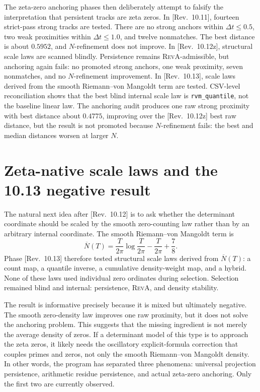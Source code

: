 \documentclass[11pt]{article}
\newcommand{\RevA}{\textsc{RevA}}
\newcommand{\revtag}[1]{\textnormal{[Rev.~#1]}}
\theoremstyle{definition}
\theoremstyle{plain}
\begin{document}
The zeta-zero anchoring phases then deliberately attempt to falsify the interpretation that persistent tracks are zeta zeros.  In \revtag{10.11}, fourteen strict-pass strong tracks are tested.  There are no strong anchors within $\Delta t\le 0.5$, two weak proximities within $\Delta t\le 1.0$, and twelve nonmatches.  The best distance is about $0.5952$, and $N$-refinement does not improve.  In \revtag{10.12z}, structural scale laws are scanned blindly.  Persistence remains \RevA-admissible, but anchoring again fails: no promoted strong anchors, one weak proximity, seven nonmatches, and no $N$-refinement improvement.  In \revtag{10.13}, scale laws derived from the smooth Riemann--von Mangoldt term are tested.  CSV-level reconciliation shows that the best blind internal scale law is \texttt{rvm\_quantile}, not the baseline linear law.  The anchoring audit produces one raw strong proximity with best distance about $0.4775$, improving over the \revtag{10.12z} best raw distance, but the result is not promoted because $N$-refinement fails: the best and median distances worsen at larger $N$.

\section{Zeta-native scale laws and the 10.13 negative result}

The natural next idea after \revtag{10.12} is to ask whether the determinant coordinate should be scaled by the smooth zero-counting law rather than by an arbitrary internal coordinate.  The smooth Riemann--von Mangoldt term is
\begin{equation}
  \overline N(T)=\frac{T}{2\pi}\log\frac{T}{2\pi}-\frac{T}{2\pi}+\frac78.
\end{equation}
Phase \revtag{10.13} therefore tested structural scale laws derived from $\overline N(T)$: a count map, a quantile inverse, a cumulative density-weight map, and a hybrid.  None of these laws used individual zero ordinates during selection.  Selection remained blind and internal: persistence, \RevA{}, and density stability.

The result is informative precisely because it is mixed but ultimately negative.  The smooth zero-density law improves one raw proximity, but it does not solve the anchoring problem.  This suggests that the missing ingredient is not merely the average density of zeros.  If a determinant model of this type is to approach the zeta zeros, it likely needs the oscillatory explicit-formula correction that couples primes and zeros, not only the smooth Riemann--von Mangoldt density.  In other words, the program has separated three phenomena: universal projection persistence, arithmetic residue persistence, and actual zeta-zero anchoring.  Only the first two are currently observed.
\end{document}
